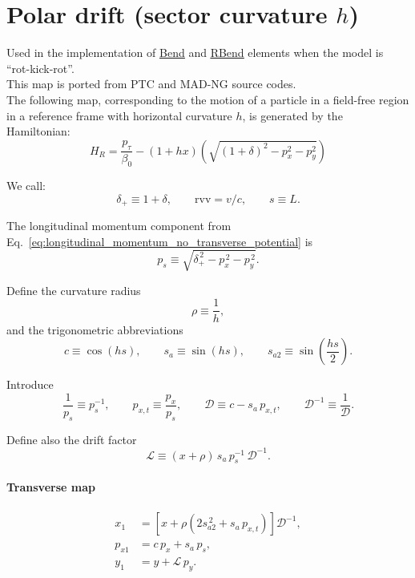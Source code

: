 \section{Polar drift (sector curvature $h$)}

Used in the implementation of \href{https://xsuite.readthedocs.io/en/latest/apireference.html#bend}{\underline{Bend}}
and \href{https://xsuite.readthedocs.io/en/latest/apireference.html#rbend}{\underline{RBend}} elements
when the model is ``rot-kick-rot''.
~\\
This map is ported from PTC and MAD-NG source codes.
~\\

The following map, corresponding to the motion of a particle in a field-free region
in a reference frame with horizontal curvature $h$,  is generated by the Hamiltonian:
\begin{equation}
H_R = \frac{p_\tau}{\beta_0} -(1 + hx) \left( \sqrt{(1 + \delta)^2 - p_x^2 - p_y^2}\right)
\end{equation}

We call:
\[
\delta_+ \equiv 1+\delta,\qquad \mathrm{rvv}=v/c,
\qquad s \equiv L.
\]

The longitudinal momentum component from
Eq.~\eqref{eq:longitudinal_momentum_no_transverse_potential} is
\begin{equation}
p_s \equiv \sqrt{\delta_+^{\,2}-p_x^{\,2}-p_y^{\,2}} .
\end{equation}

Define the curvature radius
\begin{equation}
\rho \equiv \frac{1}{h},
\end{equation}
and the trigonometric abbreviations
\begin{equation}
c \equiv \cos(hs),\qquad
s_a \equiv \sin(hs),\qquad
s_{a2}\equiv \sin\!\left(\frac{hs}{2}\right).
\end{equation}

Introduce
\begin{equation}
\frac{1}{p_s} \equiv p_s^{-1},\qquad
p_{x,t} \equiv \frac{p_x}{p_s},
\qquad
\mathcal{D} \equiv c - s_a\, p_{x,t},
\qquad
\mathcal{D}^{-1} \equiv \frac{1}{\mathcal{D}}.
\end{equation}

Define also the drift factor
\begin{equation}
\mathcal{L} \equiv (x+\rho)\, s_a\, p_s^{-1}\, \mathcal{D}^{-1}.
\end{equation}

\paragraph{Transverse map}
\begin{align}
x_1 &=
\left[
x+\rho\left(2 s_{a2}^{\,2}+ s_a\, p_{x,t}\right)
\right]\mathcal{D}^{-1},
\\
p_{x1} &= c\,p_x + s_a\, p_s,
\\
y_1 &= y + \mathcal{L}\, p_y.
\end{align}

